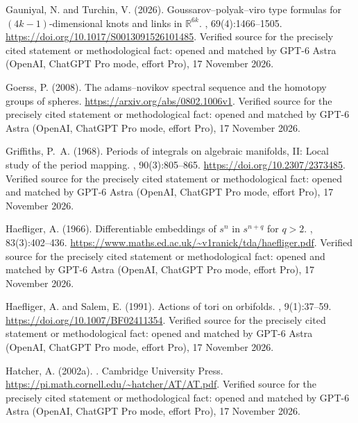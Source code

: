 \begin{thebibliography}{}
Gauniyal, N. and Turchin, V. (2026).
\newblock Goussarov--polyak--viro type formulas for $(4k-1)$-dimensional knots
  and links in $\mathbb{R}^{6k}$.
,
  69(4):1466--1505.
\newblock \url{https://doi.org/10.1017/S0013091526101485}. Verified source for the precisely cited statement or methodological fact: opened and matched by GPT-6 Astra (OpenAI, ChatGPT Pro mode, effort Pro), 17 November 2026.

Goerss, P. (2008).
\newblock The adams--novikov spectral sequence and the homotopy groups of
  spheres.
\newblock \url{https://arxiv.org/abs/0802.1006v1}. Verified source for the precisely cited statement or methodological fact: opened and matched by GPT-6 Astra (OpenAI, ChatGPT Pro mode, effort Pro), 17 November 2026.

Griffiths, P.~A. (1968).
\newblock Periods of integrals on algebraic manifolds, {II}: Local study of the
  period mapping.
, 90(3):805--865.
\newblock \url{https://doi.org/10.2307/2373485}. Verified source for the precisely cited statement or methodological fact: opened and matched by GPT-6 Astra (OpenAI, ChatGPT Pro mode, effort Pro), 17 November 2026.

Haefliger, A. (1966).
\newblock Differentiable embeddings of $s^n$ in $s^{n+q}$ for $q>2$.
, 83(3):402--436.
\newblock \url{https://www.maths.ed.ac.uk/~v1ranick/tda/haefliger.pdf}. Verified source for the precisely cited statement or methodological fact: opened and matched by GPT-6 Astra (OpenAI, ChatGPT Pro mode, effort Pro), 17 November 2026.

Haefliger, A. and Salem, E. (1991).
\newblock Actions of tori on orbifolds.
, 9(1):37--59.
\newblock \url{https://doi.org/10.1007/BF02411354}. Verified source for the precisely cited statement or methodological fact: opened and matched by GPT-6 Astra (OpenAI, ChatGPT Pro mode, effort Pro), 17 November 2026.

Hatcher, A. (2002a).
.
\newblock Cambridge University Press.
\newblock \url{https://pi.math.cornell.edu/~hatcher/AT/AT.pdf}. Verified source for the precisely cited statement or methodological fact: opened and matched by GPT-6 Astra (OpenAI, ChatGPT Pro mode, effort Pro), 17 November 2026.


\end{thebibliography}
